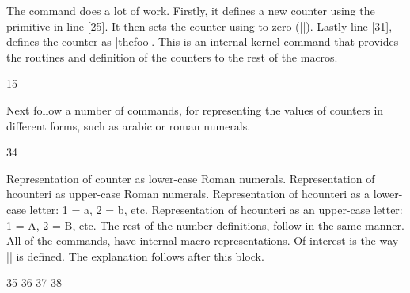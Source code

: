 \begin{macro}{\@definecounter}
The command does a lot of work. Firstly, it defines a new counter using the \tex primitive  in line [25]. It then sets the counter using  to zero (|\z@|). Lastly line [31], defines the counter as |thefoo|. This is an internal kernel command that provides the routines and definition of the counters to the rest of the macros.
\end{macro}

\begin{teXXX}
15 \def\@newctr#1[#2]{%
16   \@ifundefined{c@#2}{\@nocounterr{#2}}{\@addtoreset{#1}{#2}}}
\end{teXXX}




\begin{macro}{\arabic} 
Next follow a number of commands, for representing the values of counters in different forms, such
as arabic or roman numerals.
\end{macro}

\begin{teXXX}
34 \def\arabic#1{\expandafter\@arabic\csname c@#1\endcsname}
\end{teXXX}

\begin{macro}{\roman} 
\begin{macro}{\Roman}
\begin{macro}{\alph}
\begin{macro}{\Alph}
Representation of counter as lower-case Roman numerals.  Representation of hcounteri as upper-case Roman numerals.  Representation of hcounteri as a lower-case letter: 1 = a, 2 = b, etc.  Representation of hcounteri as an upper-case letter: 1 = A, 2 = B, etc.
The rest of the number definitions, follow in the same manner.  All of the commands, have internal macro representations. Of interest is the way |\Roman| is defined. The explanation follows after this block.
\end{macro}
\end{macro}
\end{macro}
\end{macro}

\begin{teXXX}
35 \def\roman#1{\expandafter\@roman\csname c@#1\endcsname}
36 \def\Roman#1{\expandafter\@Roman\csname c@#1\endcsname}
37 \def\alph#1{\expandafter\@alph\csname c@#1\endcsname}
38 \def\Alph#1{\expandafter\@Alph\csname c@#1\endcsname}
\end{teXXX}

